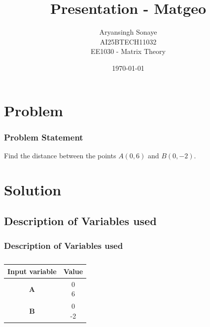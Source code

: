 \documentclass{beamer}
\title{Presentation - Matgeo}
\author{Aryansingh Sonaye \\
AI25BTECH11032 \\
EE1030 - Matrix Theory}
\date{\today}
\theoremstyle{remark}
\newcommand{\myvec}[1]{\ensuremath{\begin{pmatrix}#1\end{pmatrix}}}
\let\vec\mathbf
\numberwithin{equation}{section}
\begin{document}
\begin{frame}
\titlepage
\end{frame}

\section{Problem}
\begin{frame}
\frametitle{Problem Statement}
Find the distance between the points $A(0,6)$ and $B(0,-2)$.
\end{frame}

\section{Solution}
\subsection{Description of Variables used}
\begin{frame}
\frametitle{Description of Variables used}
\begin{table}[H]
\centering
\begin{tabular}[12pt]{ |c| c|}
    \hline
    \textbf{Input variable} & \textbf{Value}\\ 
    \hline
    $\vec{A}$ & \myvec{0 \\6 } \\
    \hline 
    $\vec{B}$ & \myvec{0 \\ -2}\\
    \hline
    \end{tabular}
    \caption{
    \label{}
    }
 \end{table}


\end{frame}
\end{document}
